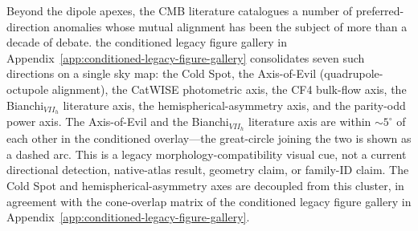 Beyond the dipole apexes, the CMB literature catalogues a number of
preferred-direction anomalies whose mutual alignment has been the
subject of more than a decade of debate.
the conditioned legacy figure gallery in Appendix~\ref{app:conditioned-legacy-figure-gallery} consolidates seven such
directions on a single sky map: the Cold Spot, the Axis-of-Evil
(quadrupole-octupole alignment), the CatWISE photometric axis, the
CF4 bulk-flow axis, the Bianchi$_{VII_h}$ literature axis, the
hemispherical-asymmetry axis, and the parity-odd power axis.  The
Axis-of-Evil and the Bianchi$_{VII_h}$ literature axis are within
$\sim 5^{\circ}$ of each other in the conditioned overlay---the
great-circle joining the two is shown as a dashed arc.  This is a
legacy morphology-compatibility visual cue, not a current directional
detection, native-atlas result, geometry claim, or family-ID claim.
The Cold Spot and
hemispherical-asymmetry axes are decoupled from this cluster, in
agreement with the cone-overlap matrix of
the conditioned legacy figure gallery in Appendix~\ref{app:conditioned-legacy-figure-gallery}.

